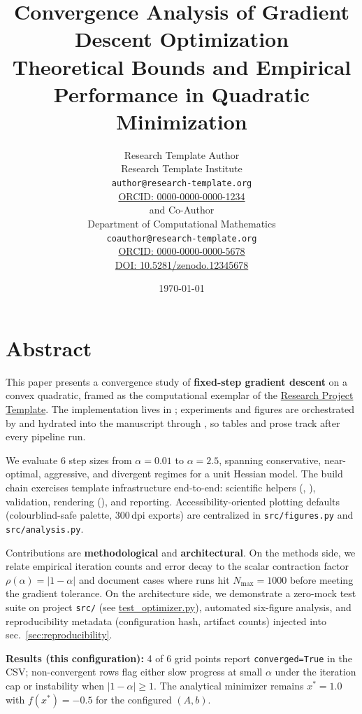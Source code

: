 \documentclass[
]{article}
\author{}
\date{}
\title{Convergence Analysis of Gradient Descent Optimization\\\normalsize Theoretical Bounds and Empirical Performance in Quadratic Minimization}
\author{Research Template Author\\\footnotesize{Research Template Institute}\\\footnotesize{\texttt{author@research-template.org}}\\\footnotesize{\href{https://orcid.org/0000-0000-0000-1234}{ORCID: 0000-0000-0000-1234}} \\and Co-Author\\\footnotesize{Department of Computational Mathematics}\\\footnotesize{\texttt{coauthor@research-template.org}}\\\footnotesize{\href{https://orcid.org/0000-0000-0000-5678}{ORCID: 0000-0000-0000-5678}} \\ \footnotesize{\href{https://doi.org/10.5281/zenodo.12345678}{DOI: 10.5281/zenodo.12345678}}}
\date{\today}
\begin{document}
\maketitle
\thispagestyle{empty}
\tableofcontents
\newpage


\section{Abstract}\label{sec:abstract}

This paper presents a convergence study of \textbf{fixed-step gradient
descent} on a convex quadratic, framed as the computational exemplar of
the \href{https://github.com/docxology/template}{Research Project
Template}. The implementation lives in
; experiments
and figures are orchestrated by
and hydrated into the manuscript through
, so tables and
prose track  after every
pipeline run.

We evaluate 6 step sizes from \(\alpha = 0.01\) to \(\alpha = 2.5\),
spanning conservative, near-optimal, aggressive, and divergent regimes
for a unit Hessian model. The build chain exercises template
infrastructure end-to-end: scientific helpers
(,
), validation, rendering
(), and reporting.
Accessibility-oriented plotting defaults (colourblind-safe palette,
300\,dpi exports) are centralized in \texttt{src/figures.py} and
\texttt{src/analysis.py}.

Contributions are \textbf{methodological} and \textbf{architectural}. On
the methods side, we relate empirical iteration counts and error decay
to the scalar contraction factor \(\rho(\alpha) = |1-\alpha|\) and
document cases where runs hit \(N_{\max} = 1000\) before meeting the
gradient tolerance. On the architecture side, we demonstrate a zero-mock
test suite on project \texttt{src/} (see
\href{https://github.com/docxology/template/blob/main/projects/template_code_project/tests/test_optimizer.py}{test\_optimizer.py}),
automated six-figure analysis, and reproducibility metadata
(configuration hash, artifact counts) injected into
sec.~\ref{sec:reproducibility}.

\textbf{Results (this configuration):} 4 of 6 grid points report
\texttt{converged=True} in the CSV; non-convergent rows flag either slow
progress at small \(\alpha\) under the iteration cap or instability when
\(|1-\alpha| \geq 1\). The analytical minimizer remains \(x^\ast = 1.0\)
with \(f(x^\ast) = -0.5\) for the configured \((A,b)\).
\end{document}
